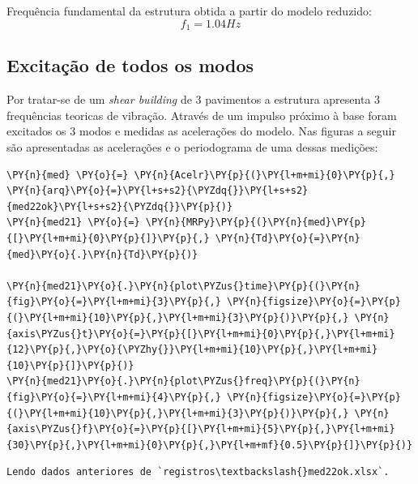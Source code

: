     Frequência fundamental da estrutura obtida a partir do modelo reduzido: $$f_1 = 1.04 Hz$$

    
    \hypertarget{excitauxe7uxe3o-de-todos-os-modos}{%
\subsection{Excitação de todos os
modos}\label{excitauxe7uxe3o-de-todos-os-modos}}

Por tratar-se de um \emph{shear building} de 3 pavimentos a estrutura
apresenta 3 frequências teoricas de vibração. Através de um impulso
próximo à base foram excitados os 3 modos e medidas as acelerações do
modelo. Nas figuras a seguir são apresentadas as acelerações e o
periodograma de uma dessas medições:

    \begin{tcolorbox}[breakable, size=fbox, boxrule=1pt, pad at break*=1mm,colback=cellbackground, colframe=cellborder]
\begin{Verbatim}[commandchars=\\\{\}]
\PY{n}{med} \PY{o}{=} \PY{n}{Acelr}\PY{p}{(}\PY{l+m+mi}{0}\PY{p}{,} \PY{n}{arq}\PY{o}{=}\PY{l+s+s2}{\PYZdq{}}\PY{l+s+s2}{med22ok}\PY{l+s+s2}{\PYZdq{}}\PY{p}{)}
\PY{n}{med21} \PY{o}{=} \PY{n}{MRPy}\PY{p}{(}\PY{n}{med}\PY{p}{[}\PY{l+m+mi}{0}\PY{p}{]}\PY{p}{,} \PY{n}{Td}\PY{o}{=}\PY{n}{med}\PY{o}{.}\PY{n}{Td}\PY{p}{)}

\PY{n}{med21}\PY{o}{.}\PY{n}{plot\PYZus{}time}\PY{p}{(}\PY{n}{fig}\PY{o}{=}\PY{l+m+mi}{3}\PY{p}{,} \PY{n}{figsize}\PY{o}{=}\PY{p}{(}\PY{l+m+mi}{10}\PY{p}{,}\PY{l+m+mi}{3}\PY{p}{)}\PY{p}{,} \PY{n}{axis\PYZus{}t}\PY{o}{=}\PY{p}{[}\PY{l+m+mi}{0}\PY{p}{,}\PY{l+m+mi}{12}\PY{p}{,}\PY{o}{\PYZhy{}}\PY{l+m+mi}{10}\PY{p}{,}\PY{l+m+mi}{10}\PY{p}{]}\PY{p}{)}
\PY{n}{med21}\PY{o}{.}\PY{n}{plot\PYZus{}freq}\PY{p}{(}\PY{n}{fig}\PY{o}{=}\PY{l+m+mi}{4}\PY{p}{,} \PY{n}{figsize}\PY{o}{=}\PY{p}{(}\PY{l+m+mi}{10}\PY{p}{,}\PY{l+m+mi}{3}\PY{p}{)}\PY{p}{,} \PY{n}{axis\PYZus{}f}\PY{o}{=}\PY{p}{[}\PY{l+m+mi}{5}\PY{p}{,}\PY{l+m+mi}{30}\PY{p}{,}\PY{l+m+mi}{0}\PY{p}{,}\PY{l+m+mf}{0.5}\PY{p}{]}\PY{p}{)}
\end{Verbatim}
\end{tcolorbox}

    \begin{Verbatim}[commandchars=\\\{\}]
Lendo dados anteriores de `registros\textbackslash{}med22ok.xlsx`.
    \end{Verbatim}

